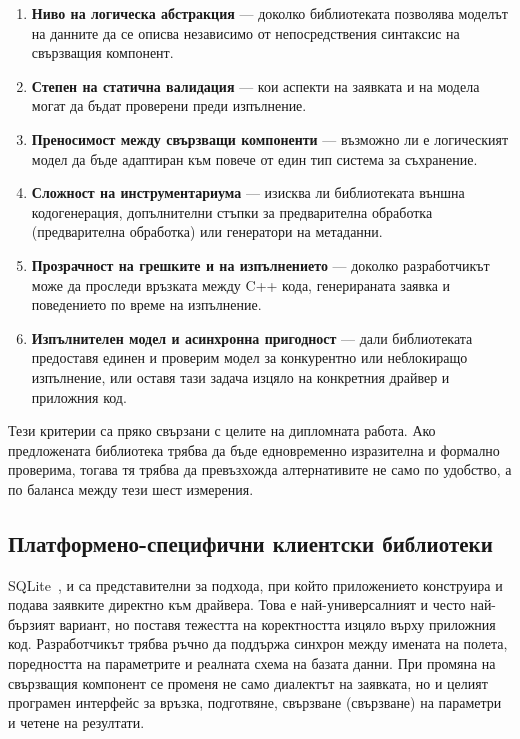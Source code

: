 \begin{enumerate}[label=\arabic*.]
    \item \textbf{Ниво на логическа абстракция} --- доколко библиотеката позволява моделът на данните да се описва независимо от непосредствения синтаксис на свързващия компонент.
    \item \textbf{Степен на статична валидация} --- кои аспекти на заявката и на модела могат да бъдат проверени преди изпълнение.
    \item \textbf{Преносимост между свързващи компоненти} --- възможно ли е логическият модел да бъде адаптиран към повече от един тип система за съхранение.
    \item \textbf{Сложност на инструментариума} --- изисква ли библиотеката външна кодогенерация, допълнителни стъпки за предварителна обработка (предварителна обработка) или генератори на метаданни.
    \item \textbf{Прозрачност на грешките и на изпълнението} --- доколко разработчикът може да проследи връзката между C++ кода, генерираната заявка и поведението по време на изпълнение.
    \item \textbf{Изпълнителен модел и асинхронна пригодност} --- дали библиотеката предоставя единен и проверим модел за конкурентно или неблокиращо изпълнение, или оставя тази задача изцяло на конкретния драйвер и приложния код.
\end{enumerate}

Тези критерии са пряко свързани с целите на дипломната работа. Ако предложената библиотека трябва да бъде едновременно изразителна и формално проверима, тогава тя трябва да превъзхожда алтернативите не само по удобство, а по баланса между тези шест измерения.

\subsection{Платформено-специфични клиентски библиотеки}

SQLite~\cite{sqlite},  и  са представителни за подхода, при който приложението конструира и подава заявките директно към драйвера. Това е най-универсалният и често най-бързият вариант, но поставя тежестта на коректността изцяло върху приложния код. Разработчикът трябва ръчно да поддържа синхрон между имената на полета, поредността на параметрите и реалната схема на базата данни. При промяна на свързващия компонент се променя не само диалектът на заявката, но и целият програмен интерфейс за връзка, подготвяне, свързване (свързване) на параметри и четене на резултати.


